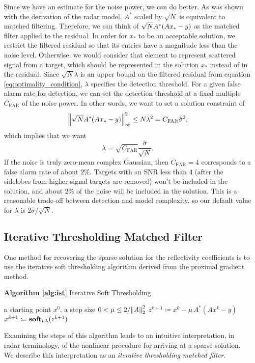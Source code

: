 Since we have an estimate for the noise power, we can do better. As was shown with the derivation of the radar model, $A^*$ scaled by $\sqrt{N}$ is equivalent to matched filtering. Therefore, we can think of $\sqrt{N} A^*\paren*{Ax_* - y}$ as the matched filter applied to the residual. In order for $x_*$ to be an acceptable solution, we restrict the filtered residual so that its entries have a magnitude less than the noise level. Otherwise, we would consider that element to represent scattered signal from a target, which should be represented in the solution $x_*$ instead of in the residual. Since $\sqrt{N} \lambda$ is an upper bound on the filtered residual from equation \eqref{eq:optimality_condition}, $\lambda$ specifies the detection threshold. For a given false alarm rate for detection, we can set the detection threshold at a fixed multiple $C_\text{FAR}$ of the noise power. In other words, we want to set a solution constraint of
\begin{equation}
 \norm{\infty}{\sqrt{N} A^*\paren*{Ax_* - y}}^2 \le N\lambda^2 = C_\text{FAR} \hat{\sigma}^2,
\end{equation}
which implies that we want
\begin{equation}
 \lambda = \sqrt{C_\text{FAR}} \frac{\hat{\sigma}}{\sqrt{N}}.
\end{equation}
If the noise is truly zero-mean complex Gaussian, then $C_\text{FAR} = 4$ corresponds to a false alarm rate of about $2\%$. Targets with an SNR less than $4$ (after the sidelobes from higher-signal targets are removed) won't be included in the solution, and about $2\%$ of the noise will be included in the solution. This is a reasonable trade-off between detection and model complexity, so our default value for $\lambda$ is $2\hat{\sigma}/\sqrt{N}$.

\subsection{Iterative Thresholding Matched Filter}
One method for recovering the sparse solution for the reflectivity coefficients is to use the iterative soft thresholding algorithm derived from the proximal gradient method.
\begin{algorithm}
 \caption*{\textbf{Algorithm \ref{alg:ist}} Iterative Soft Thresholding}
 \begin{algorithmic}
  \GIVEN a starting point $x^0$, a step size $0 < \mu \le 2/\norm{2}{A}^2$
  \REPEAT
  \STATE $z^{k+1} \coloneqq x^k - \mu \, A^*(Ax^k - y)$
  \STATE $x^{k+1} \coloneqq \operatorname{\mathbf{soft}}_{\mu \lambda}(z^{k+1})$
 \end{algorithmic}
\end{algorithm}%
Examining the steps of this algorithm leads to an intuitive interpretation, in radar terminology, of the nonlinear procedure for arriving at a sparse solution. We describe this interpretation as an \emph{iterative thresholding matched filter}.

